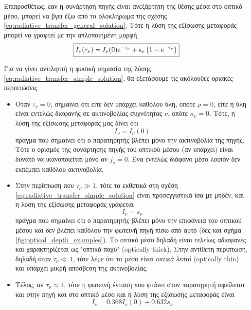Επιπροσθέτως, εαν η συνάρτηση πηγής είναι ανεξάρτητη της θέσης μέσα στο οπτικό μέσο, μπορεί να βγει έξω από το ολοκλήρωμα της σχέσης \eqref{eq:radiative_transfer_general_solution}. Τότε η λύση της εξίσωσης μεταφοράς μπορεί να γραφτεί με την απλοποιημένη μορφή
\begin{equation}
    \label{eq:radiative_transfer_simple_solution}
    \boxed{I_{\nu}(\tau_{\nu}) = I_{\nu} (0) \rm e^{- \tau_{\nu}} + s_{\nu} \left( 1 - \rm e^{- \tau_{\nu}} \right)}
\end{equation}

Για να γίνει αντιληπτή η φυσική σημασία της λύσης \eqref{eq:radiative_transfer_simple_solution}, θα εξετάσουμε τις ακόλουθες οριακές περιπτώσεις

\begin{itemize}
    \item Όταν $\tau_{\nu} = 0$, σημαίνει ότι είτε δεν υπάρχει καθόλου ύλη, οπότε $\rho = 0$, είτε η ύλη είναι εντελώς διαφανής σε ακτινοβολίας συχνότητας $\nu$, οπότε $\kappa_{\nu} = 0$. Τότε, η λύση της εξίσωσης μεταφοράς μας δίνει ότι $$I_{\nu} = I_{\nu}(0)$$ πράγμα που σημαίνει ότι ο παρατηρητής βλέπει μόνο την ακτινοβολία της πηγής. Τότε ο ορισμός της συνάρτησης πηγής του οπτικού μέσου (αν υπάρχει) είναι δυνατό να ικανοποιείται μόνο αν $j_{\nu} = 0$. Ένα εντελώς διάφανο μέσο λοιπόν δεν εκπέμπει καθόλου ακτινοβολία.
    \item Στην περίπτωση που $\tau_{\nu} \gg 1$, τότε τα εκθετικά στη σχέση \eqref{eq:radiative_transfer_simple_solution} είναι προσεγγιστικά ίσα με μηδέν, και η λύση της εξίσωσης μεταφοράς γράφεται $$I_{\nu} = s_{\nu}$$ πράγμα που σημαίνει ότι ο παρατηρητής βλέπει μόνο την επιφάνεια του οπτικού μέσου και δεν βλέπει καθόλου την φωτεινή πηγή πίσω από αυτό (δες και σχήμα \ref{fig:optical_depth_examples}). Το οπτικό μέσο δηλαδή είναι τελείως αδιαφανές και χαρακτηρίζεται ως "οπτικά παχύ" (optically thick).
    Στην αντίθετη περίπτωση, δηλαδή όταν $\tau_{\nu} \ll 1$, τότε λέμε ότι το μέσο είναι \textit{οπτικά λεπτό} (optically thin) και υπάρχει μικρή απόσβεση της ακτινοβολίας.
    \item Τέλος, αν $\tau_{\nu} \approx 1$, τότε η φωτεινή ένταση που φτάνει στον παρατηρητή οφείλεται και στην πηγή και στο οπτικό μέσο και η λύση της εξίσωσης μεταφοράς είναι $$I_{\nu} = 0.368 I_{\nu}(0) + 0.632 s_{\nu}$$
\end{itemize}

